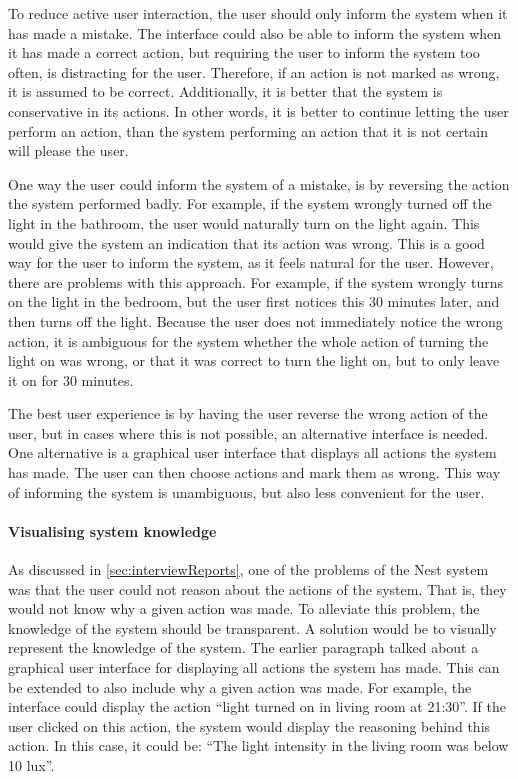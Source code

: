 To reduce active user interaction, the user should only inform the system when it has made a mistake. The interface could also be able to inform the system when it has made a correct action, but requiring the user to inform the system too often, is distracting for the user. Therefore, if an action is not marked as wrong, it is assumed to be correct. Additionally, it is better that the system is conservative in its actions. In other words, it is better to continue letting the user perform an action, than the system performing an action that it is not certain will please the user.

One way the user could inform the system of a mistake, is by reversing the action the system performed badly. For example, if the system wrongly turned off the light in the bathroom, the user would naturally turn on the light again. This would give the system an indication that its action was wrong. This is a good way for the user to inform the system, as it feels natural for the user. However, there are problems with this approach. For example, if the system wrongly turns on the light in the bedroom, but the user first notices this 30 minutes later, and then turns off the light. Because the user does not immediately notice the wrong action, it is ambiguous for the system whether the whole action of turning the light on was wrong, or that it was correct to turn the light on, but to only leave it on for 30 minutes.

The best user experience is by having the user reverse the wrong action of the user, but in cases where this is not possible, an alternative interface is needed. One alternative is a graphical user interface that displays all actions the system has made. The user can then choose actions and mark them as wrong. This way of informing the system is unambiguous, but also less convenient for the user.

\paragraph{Visualising system knowledge}

As discussed in \cref{sec:interviewReports}, one of the problems of the Nest system was that the user could not reason about the actions of the system. That is, they would not know why a given action was made. To alleviate this problem, the knowledge of the system should be transparent. A solution would be to visually represent the knowledge of the system. The earlier paragraph talked about a graphical user interface for displaying all actions the system has made. This can be extended to also include why a given action was made. For example, the interface could display the action \enquote{light turned on in living room at 21:30}. If the user clicked on this action, the system would display the reasoning behind this action. In this case, it could be: \enquote{The light intensity in the living room was below 10 lux}.
